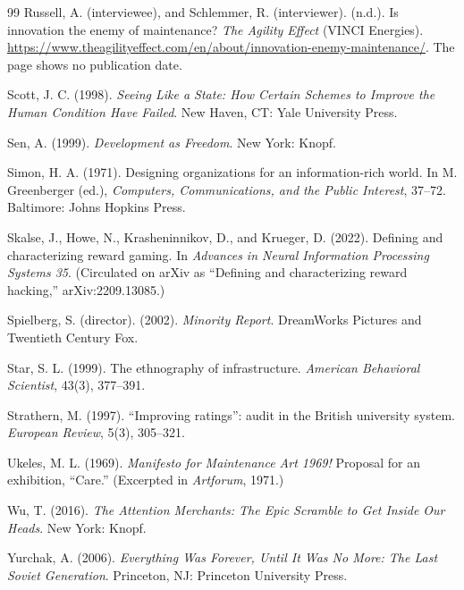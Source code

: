 \documentclass[11pt]{article}
\theoremstyle{definition}
\theoremstyle{remark}
\begin{document}
\begin{thebibliography}{99}
Russell, A. (interviewee), and Schlemmer, R. (interviewer). (n.d.). Is innovation the enemy of maintenance? \emph{The Agility Effect} (VINCI Energies). \url{https://www.theagilityeffect.com/en/about/innovation-enemy-maintenance/}. The page shows no publication date.

Scott, J. C. (1998). \emph{Seeing Like a State: How Certain Schemes to Improve the Human Condition Have Failed}. New Haven, CT: Yale University Press.

Sen, A. (1999). \emph{Development as Freedom}. New York: Knopf.

Simon, H. A. (1971). Designing organizations for an information-rich world. In M. Greenberger (ed.), \emph{Computers, Communications, and the Public Interest}, 37--72. Baltimore: Johns Hopkins Press.

Skalse, J., Howe, N., Krasheninnikov, D., and Krueger, D. (2022). Defining and characterizing reward gaming. In \emph{Advances in Neural Information Processing Systems 35}. (Circulated on arXiv as ``Defining and characterizing reward hacking,'' arXiv:2209.13085.)

Spielberg, S. (director). (2002). \emph{Minority Report}. DreamWorks Pictures and Twentieth Century Fox.

Star, S. L. (1999). The ethnography of infrastructure. \emph{American Behavioral Scientist}, 43(3), 377--391.

Strathern, M. (1997). ``Improving ratings'': audit in the British university system. \emph{European Review}, 5(3), 305--321.

Ukeles, M. L. (1969). \emph{Manifesto for Maintenance Art 1969!} Proposal for an exhibition, ``Care.'' (Excerpted in \emph{Artforum}, 1971.)

Wu, T. (2016). \emph{The Attention Merchants: The Epic Scramble to Get Inside Our Heads}. New York: Knopf.

Yurchak, A. (2006). \emph{Everything Was Forever, Until It Was No More: The Last Soviet Generation}. Princeton, NJ: Princeton University Press.

\end{thebibliography}
\end{document}
